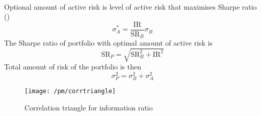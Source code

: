 \begin{remark} \\
Optional amount of active risk is level of active risk that maximises Sharpe ratio ()
\begin{equation}
\sigma_A^{*} = \frac{\text{IR}}{\text{SR}_B} \sigma_B \nonumber
\end{equation}
The Sharpe ratio of portfolio with optimal amount of active risk is
\begin{equation}
\text{SR}_P = \sqrt{\text{SR}_B^2 + \text{IR}^2} \nonumber
\end{equation}
Total amount of risk of the portfolio is then
\begin{equation}
\sigma_P^2 = \sigma_B^2 + \sigma_A^2 \nonumber
\end{equation}
\end{remark}

\begin{figure}[H]
\centering
\texttt{[image: /pm/corrtriangle]}
\caption{Correlation triangle for information ratio}
\end{figure}

